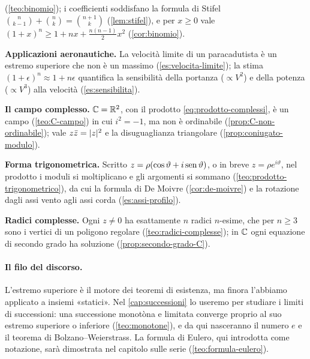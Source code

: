 \begin{puntichiave}
(\cref{teo:binomio}); i coefficienti soddisfano la formula di Stifel
$\binom n{k-1}+\binom nk=\binom{n+1}k$ (\cref{lem:stifel}), e per $x\ge0$ vale
$(1+x)^{n}\ge1+nx+\frac{n(n-1)}2x^{2}$ (\cref{cor:binomio}).
\item \textbf{Applicazioni aeronautiche.} La velocità limite di un paracadutista è un
estremo superiore che non è un massimo (\cref{es:velocita-limite}); la stima
$(1+\epsilon)^{n}\approx1+n\epsilon$ quantifica la sensibilità della portanza ($\propto
V^{2}$) e della potenza ($\propto V^{3}$) alla velocità (\cref{es:sensibilita}).
\item \textbf{Il campo complesso.} $\mathbb{C}=\mathbb{R}^{2}$, con il prodotto
\eqref{eq:prodotto-complessi}, è un campo (\cref{teo:C-campo}) in cui $i^{2}=-1$, ma
non è ordinabile (\cref{prop:C-non-ordinabile}); vale $z\bar z=\lvert z\rvert^{2}$ e la
disuguaglianza triangolare (\cref{prop:coniugato-modulo}).
\item \textbf{Forma trigonometrica.} Scritto $z=\rho(\cos\vartheta+i\operatorname{sen}\vartheta)$,
o in breve $z=\rho e^{i\vartheta}$, nel prodotto i moduli si moltiplicano e gli
argomenti si sommano (\cref{teo:prodotto-trigonometrico}), da cui la formula di De
Moivre (\cref{cor:de-moivre}) e la rotazione dagli assi vento agli assi corda
(\cref{es:assi-profilo}).
\item \textbf{Radici complesse.} Ogni $z\neq0$ ha esattamente $n$ radici $n$-esime, che
per $n\ge3$ sono i vertici di un poligono regolare (\cref{teo:radici-complesse}); in
$\mathbb{C}$ ogni equazione di
secondo grado ha soluzione (\cref{prop:secondo-grado-C}).
\end{puntichiave}

\paragraph{Il filo del discorso.} L'estremo superiore è il motore dei teoremi di
esistenza, ma finora l'abbiamo applicato a insiemi «statici». Nel \cref{cap:successioni}
lo useremo per studiare i limiti di successioni: una successione monotòna e limitata
converge proprio al suo estremo superiore o inferiore (\cref{teo:monotone}), e da qui
nasceranno il numero $e$ e il teorema di Bolzano--Weierstrass. La formula di Eulero,
qui introdotta come notazione, sarà dimostrata nel capitolo sulle serie
(\cref{teo:formula-eulero}).
